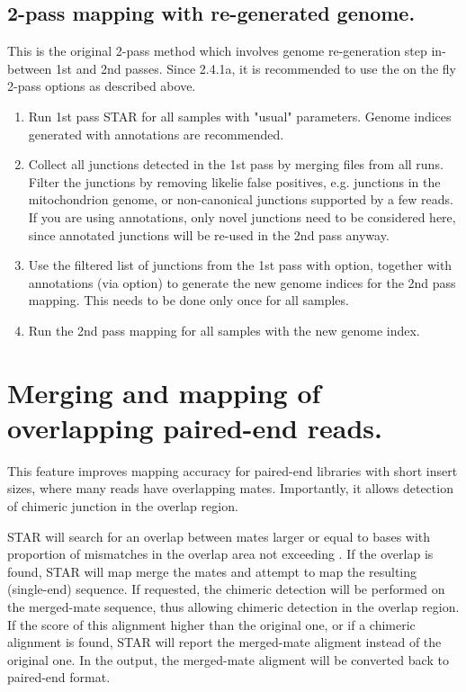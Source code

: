 \documentclass[12pt]{article}
\begin{document}
\subsection{2-pass mapping with re-generated genome.}
This is the original 2-pass method which involves genome re-generation step in-between 1st and 2nd passes. Since 2.4.1a, it is recommended to use the on the fly 2-pass options as described above.
\begin{enumerate}
\item Run 1st pass STAR for all samples with "usual" parameters. Genome indices generated with annotations are recommended.
\item Collect all junctions detected in the 1st pass by merging  files from all runs. Filter the junctions by removing likelie false positives, e.g. junctions in the mitochondrion genome, or non-canonical junctions supported by a few reads. If you are using annotations, only novel junctions need to be considered here, since annotated junctions will be re-used in the 2nd pass anyway.
\item Use the filtered list of junctions from the 1st pass with  option, together with annotations (via  option) to generate the new genome indices for the 2nd pass mapping. This needs to be done only once for all samples.
\item Run the 2nd pass mapping for all samples with the new genome index.
\end{enumerate}

\section{Merging and mapping of overlapping paired-end reads.}
This feature improves mapping accuracy  for paired-end libraries with short insert sizes, where many reads have overlapping mates. Importantly, it allows detection of chimeric junction in the overlap region.

STAR will search for an overlap between mates larger or equal to  bases with proportion of mismatches in the overlap area not exceeding .
If the overlap is found, STAR will map merge the mates and attempt to map the resulting (single-end) sequence. 
If requested, the chimeric detection will be performed on the merged-mate sequence, thus allowing chimeric detection in the overlap region.
If the score of this alignment higher than the original one, or if a chimeric alignment is found, STAR will report the merged-mate aligment instead of the original one.
In the output, the merged-mate aligment will be converted back to paired-end format.
\end{document}
